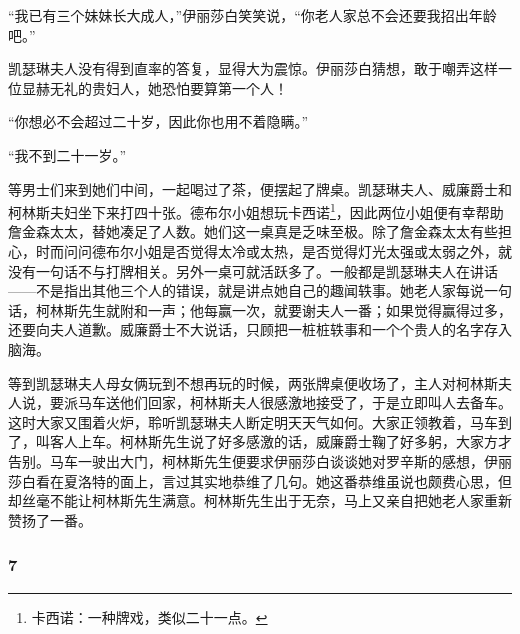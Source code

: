 \par “我已有三个妹妹长大成人，”伊丽莎白笑笑说，“你老人家总不会还要我招出年龄吧。”
\par 凯瑟琳夫人没有得到直率的答复，显得大为震惊。伊丽莎白猜想，敢于嘲弄这样一位显赫无礼的贵妇人，她恐怕要算第一个人！
\par “你想必不会超过二十岁，因此你也用不着隐瞒。”
\par “我不到二十一岁。”
\par 等男士们来到她们中间，一起喝过了茶，便摆起了牌桌。凯瑟琳夫人、威廉爵士和柯林斯夫妇坐下来打四十张。德布尔小姐想玩卡西诺\footnote{卡西诺：一种牌戏，类似二十一点。}，因此两位小姐便有幸帮助詹金森太太，替她凑足了人数。她们这一桌真是乏味至极。除了詹金森太太有些担心，时而问问德布尔小姐是否觉得太冷或太热，是否觉得灯光太强或太弱之外，就没有一句话不与打牌相关。另外一桌可就活跃多了。一般都是凯瑟琳夫人在讲话——不是指出其他三个人的错误，就是讲点她自己的趣闻轶事。她老人家每说一句话，柯林斯先生就附和一声；他每赢一次，就要谢夫人一番；如果觉得赢得过多，还要向夫人道歉。威廉爵士不大说话，只顾把一桩桩轶事和一个个贵人的名字存入脑海。
\par 等到凯瑟琳夫人母女俩玩到不想再玩的时候，两张牌桌便收场了，主人对柯林斯夫人说，要派马车送他们回家，柯林斯夫人很感激地接受了，于是立即叫人去备车。这时大家又围着火炉，聆听凯瑟琳夫人断定明天天气如何。大家正领教着，马车到了，叫客人上车。柯林斯先生说了好多感激的话，威廉爵士鞠了好多躬，大家方才告别。马车一驶出大门，柯林斯先生便要求伊丽莎白谈谈她对罗辛斯的感想，伊丽莎白看在夏洛特的面上，言过其实地恭维了几句。她这番恭维虽说也颇费心思，但却丝毫不能让柯林斯先生满意。柯林斯先生出于无奈，马上又亲自把她老人家重新赞扬了一番。



\subsubsection*{7}


